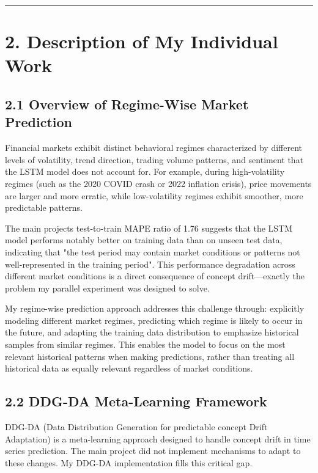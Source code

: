 \documentclass[
]{article}
\begin{document}
\begin{center}\rule{0.5\linewidth}{0.5pt}\end{center}

\section{2. Description of My Individual
Work}\label{2-description-of-my-individual-work}

\subsection{2.1 Overview of Regime-Wise Market
Prediction}\label{21-overview-of-regime-wise-market-prediction}

Financial markets exhibit distinct behavioral regimes characterized by
different levels of volatility, trend direction, trading volume
patterns, and sentiment that the LSTM model does not account for. For
example, during high-volatility regimes (such as the 2020 COVID crash or
2022 inflation crisis), price movements are larger and more erratic,
while low-volatility regimes exhibit smoother, more predictable
patterns.

The main project\textquotesingle s test-to-train MAPE ratio of 1.76
suggests that the LSTM model performs notably better on training data
than on unseen test data, indicating that "the test period may contain
market conditions or patterns not well-represented in the training
period". This performance degradation across different market conditions
is a direct consequence of concept drift---exactly the problem my
parallel experiment was designed to solve.

My regime-wise prediction approach addresses this challenge through:
explicitly modeling different market regimes, predicting which regime is
likely to occur in the future, and adapting the training data
distribution to emphasize historical samples from similar regimes. This
enables the model to focus on the most relevant historical patterns when
making predictions, rather than treating all historical data as equally
relevant regardless of market conditions.

\subsection{2.2 DDG-DA Meta-Learning
Framework}\label{22-ddg-da-meta-learning-framework}

DDG-DA (Data Distribution Generation for predictable concept Drift
Adaptation) is a meta-learning approach designed to handle concept drift
in time series prediction. The main project did not implement mechanisms
to adapt to these changes. My DDG-DA implementation fills this critical
gap.
\end{document}
